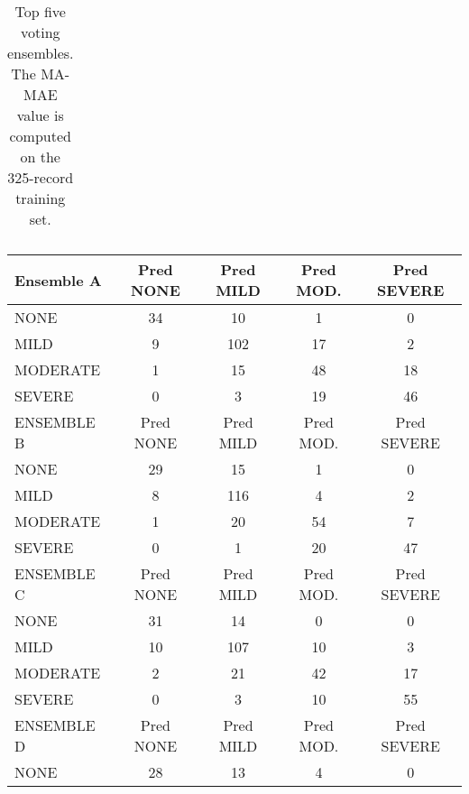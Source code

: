\begin{table}
\begin{tabular}{|cllc|}
    \end{tabular}
    \caption{Top five voting ensembles. The \textsf{MA-MAE} value
    is computed on the 325-record training set.}
    \label{tab:ourEnsembles}
\end{table}





\begin{table}
\centering
    \begin{tabular}{|l|c|c|c|c|}
   \hline
   \textsf{ \cellcolor{gray!15} Ensemble A } & \textsf{ Pred NONE } & \textsf{ Pred MILD } & \textsf{ Pred MOD. } & \textsf{ Pred SEVERE } \\ 
    \hline
    \textsf{ NONE } & \cellcolor{gray!15} 34 & 10 & 1 & 0 \\ 
    \textsf{ MILD } & 9 & \cellcolor{gray!15} 102 & 17 & 2 \\ 
    \textsf{ MODERATE } & 1 & 15 & \cellcolor{gray!15} 48 & 18 \\ 
    \textsf{ SEVERE } & 0 & 3 & 19 & \cellcolor{gray!15} 46 \\ 
   \hline
   \textsf{ \cellcolor{gray!15} ENSEMBLE B } & \textsf{ Pred NONE } & \textsf{ Pred MILD } & \textsf{ Pred MOD. } & \textsf{ Pred SEVERE } \\ 
    \hline
    \textsf{ NONE } & \cellcolor{gray!15} 29 & 15 & 1 & 0 \\ 
    \textsf{ MILD } & 8 & \cellcolor{gray!15} 116 & 4 & 2 \\ 
    \textsf{ MODERATE } & 1 & 20 & \cellcolor{gray!15} 54 & 7 \\ 
    \textsf{ SEVERE } & 0 & 1 & 20 & \cellcolor{gray!15} 47 \\ 
   \hline
   \textsf{ \cellcolor{gray!15} ENSEMBLE C } & \textsf{ Pred NONE } & \textsf{ Pred MILD } & \textsf{ Pred MOD. } & \textsf{ Pred SEVERE } \\ 
    \hline
    \textsf{ NONE } & \cellcolor{gray!15} 31 & 14 & 0 & 0 \\ 
    \textsf{ MILD } & 10 & \cellcolor{gray!15} 107 & 10 & 3 \\ 
    \textsf{ MODERATE } & 2 & 21 & \cellcolor{gray!15} 42 & 17 \\ 
    \textsf{ SEVERE } & 0 & 3 & 10 & \cellcolor{gray!15} 55 \\ 
    \hline
    \textsf{ \cellcolor{gray!15} ENSEMBLE D } & \textsf{ Pred NONE } & \textsf{ Pred MILD } & \textsf{ Pred MOD. } & \textsf{ Pred SEVERE } \\ 
    \hline
    \textsf{ NONE } & \cellcolor{gray!15} 28 & 13 & 4 & 0 \\ 

\end{tabular}
\end{table}
